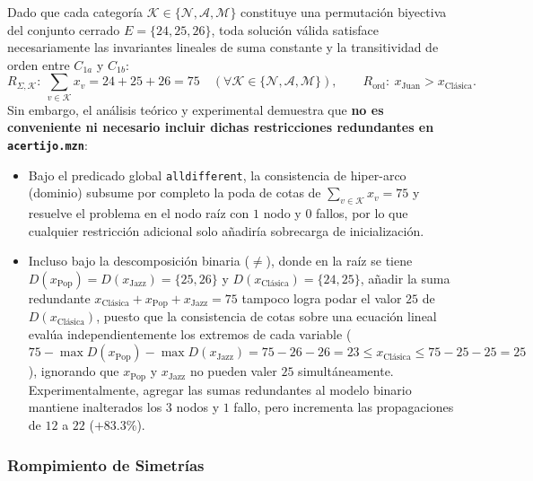 Dado que cada categoría $\mathcal{K} \in \{\mathcal{N}, \mathcal{A}, \mathcal{M}\}$ constituye una permutación biyectiva del conjunto cerrado $E = \{24, 25, 26\}$, toda solución válida satisface necesariamente las invariantes lineales de suma constante y la transitividad de orden entre $C_{1a}$ y $C_{1b}$:
\[
    R_{\Sigma, \mathcal{K}} : \ \sum_{v \in \mathcal{K}} x_v = 24 + 25 + 26 = 75 \quad (\forall \mathcal{K} \in \{\mathcal{N}, \mathcal{A}, \mathcal{M}\}), \qquad R_{\text{ord}} : \ x_{\text{Juan}} > x_{\text{Clásica}}.
\]
Sin embargo, el análisis teórico y experimental demuestra que \textbf{no es conveniente ni necesario incluir dichas restricciones redundantes en \texttt{acertijo.mzn}}:
\begin{itemize}
    \item Bajo el predicado global \texttt{alldifferent}, la consistencia de hiper-arco (dominio) subsume por completo la poda de cotas de $\sum_{v \in \mathcal{K}} x_v = 75$ y resuelve el problema en el nodo raíz con $1$ nodo y $0$ fallos, por lo que cualquier restricción adicional solo añadiría sobrecarga de inicialización.
    \item Incluso bajo la descomposición binaria ($\neq$), donde en la raíz se tiene $D(x_{\text{Pop}}) = D(x_{\text{Jazz}}) = \{25, 26\}$ y $D(x_{\text{Clásica}}) = \{24, 25\}$, añadir la suma redundante $x_{\text{Clásica}} + x_{\text{Pop}} + x_{\text{Jazz}} = 75$ tampoco logra podar el valor $25$ de $D(x_{\text{Clásica}})$, puesto que la consistencia de cotas sobre una ecuación lineal evalúa independientemente los extremos de cada variable ($75 - \max D(x_{\text{Pop}}) - \max D(x_{\text{Jazz}}) = 75 - 26 - 26 = 23 \le x_{\text{Clásica}} \le 75 - 25 - 25 = 25$), ignorando que $x_{\text{Pop}}$ y $x_{\text{Jazz}}$ no pueden valer $25$ simultáneamente. Experimentalmente, agregar las sumas redundantes al modelo binario mantiene inalterados los $3$ nodos y $1$ fallo, pero incrementa las propagaciones de $12$ a $22$ ($+83.3$\%).
\end{itemize}

\subsubsection{Rompimiento de Simetrías}

